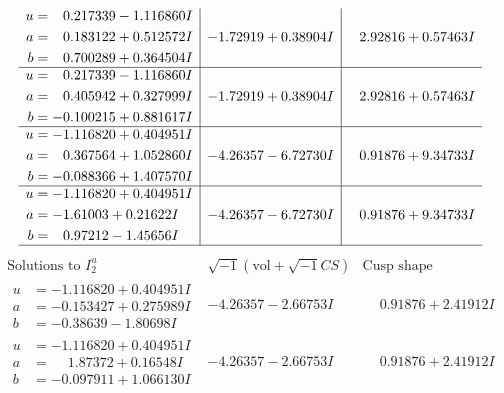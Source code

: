 \documentclass[1p]{elsarticle_modified}
\theoremstyle{definition}
\newcommand{\I}{\sqrt{-1}}
\begin{document}
$$\begin{array}{c|c|c}
\begin{aligned}
u &= \phantom{-}0.217339 - 1.116860 I \\
a &= \phantom{-}0.183122 + 0.512572 I \\
b &= \phantom{-}0.700289 + 0.364504 I\end{aligned}
 & -1.72919 + 0.38904 I & \phantom{-}2.92816 + 0.57463 I \\ \hline\begin{aligned}
u &= \phantom{-}0.217339 - 1.116860 I \\
a &= \phantom{-}0.405942 + 0.327999 I \\
b &= -0.100215 + 0.881617 I\end{aligned}
 & -1.72919 + 0.38904 I & \phantom{-}2.92816 + 0.57463 I \\ \hline\begin{aligned}
u &= -1.116820 + 0.404951 I \\
a &= \phantom{-}0.367564 + 1.052860 I \\
b &= -0.088366 + 1.407570 I\end{aligned}
 & -4.26357 - 6.72730 I & \phantom{-}0.91876 + 9.34733 I \\ \hline\begin{aligned}
u &= -1.116820 + 0.404951 I \\
a &= -1.61003 + 0.21622 I \\
b &= \phantom{-}0.97212 - 1.45656 I\end{aligned}
 & -4.26357 - 6.72730 I & \phantom{-}0.91876 + 9.34733 I\\
 \hline 
 \end{array}$$\newpage$$\begin{array}{c|c|c}  
\text{Solutions to }I^u_{2}& \I (\text{vol} + \sqrt{-1}CS) & \text{Cusp shape}\\
 \hline 
\begin{aligned}
u &= -1.116820 + 0.404951 I \\
a &= -0.153427 + 0.275989 I \\
b &= -0.38639 - 1.80698 I\end{aligned}
 & -4.26357 - 2.66753 I & \phantom{-}0.91876 + 2.41912 I \\ \hline\begin{aligned}
u &= -1.116820 + 0.404951 I \\
a &= \phantom{-}1.87372 + 0.16548 I \\
b &= -0.097911 + 1.066130 I\end{aligned}
 & -4.26357 - 2.66753 I & \phantom{-}0.91876 + 2.41912 I \\ \hline\begin{aligned}

\end{aligned}
\end{array}$$
\end{document}
